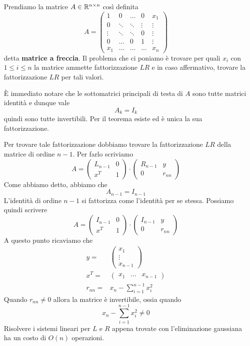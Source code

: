 \begin{example}
	Prendiamo la matrice $A \in \mathbb{R}^{n \times n}$ così definita
	\[
		A = \begin{pmatrix}
			1      & 0      & \dots  & 0      & x_1    \\
			0      & \ddots & \ddots & \vdots & \vdots \\
			\vdots & \ddots & \ddots & 0      & \vdots \\
			0      & \dots  & 0      & 1      & \vdots \\
			x_1    & \dots  & \dots  & \dots  & x_n
		\end{pmatrix}
	\]
	detta \textbf{matrice a freccia}. Il problema che ci poniamo è trovare per quali $x_i$ con $1 \leq i \leq n$
	la matrice ammette fattorizzazione $LR$ e in caso affermativo, trovare la fattorizzazione $LR$ per tali
	valori.

	\`E immediato notare che le sottomatrici principali di testa di $A$ sono tutte matrici identità e dunque vale
	\[ A_k = I_k \]
	quindi sono tutte invertibili. Per il teorema esiste ed è unica la sua fattorizzazione.

	Per trovare tale fattorizzazione dobbiamo trovare la fattorizzazione $LR$ della matrice di ordine $n-1$. Per
	farlo scriviamo
	\[
		A = \begin{pmatrix}
			L_{n-1} & 0 \\
			x^T     & 1
		\end{pmatrix} \cdot
		\begin{pmatrix}
			R_{n-1} & y      \\
			0       & r_{nn}
		\end{pmatrix}
	\]
	Come abbiamo detto, abbiamo che
	\[ A_{n-1} = I_{n-1} \]
	L'identità di ordine $n-1$ si fattorizza come l'identità per se stessa. Possiamo quindi scrivere
	\[
		A = \begin{pmatrix}
			I_{n-1} & 0 \\
			x^T     & 1
		\end{pmatrix} \cdot
		\begin{pmatrix}
			I_{n-1} & y      \\
			0       & r_{nn}
		\end{pmatrix}
	\]
	A questo punto ricaviamo che
	\begin{align*}
		y =      & \begin{pmatrix} x_1 \\ \vdots \\ x_{n-1} \end{pmatrix} \\
		x^T =    & \begin{pmatrix} x_1 & \dots & x_{n-1} \end{pmatrix}    \\
		r_{nn} = & x_n - \sum_{i=1}^{n-1} x_i^2
	\end{align*}
	Quando $r_{nn} \neq 0$ allora la matrice è invertibile, ossia quando
	\[ x_n - \sum_{i=1}^{n-1} x_i^2 \neq 0 \]
	Risolvere i sistemi lineari per $L$ e $R$ appena trovate con l'eliminazione gaussiana ha un costo di $O(n)$
	operazioni.
\end{example}

